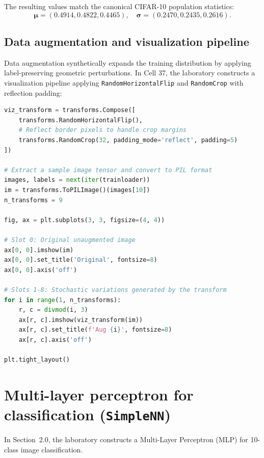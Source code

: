 \documentclass[../labs.tex]{subfiles}
\begin{document}
The resulting values match the canonical CIFAR-10 population statistics:
\begin{equation}
\boldsymbol{\mu} = (0.4914, 0.4822, 0.4465), \quad \boldsymbol{\sigma} = (0.2470, 0.2435, 0.2616).
\end{equation}

\subsection{Data augmentation and visualization pipeline}
Data augmentation synthetically expands the training distribution by applying label-preserving geometric perturbations. In Cell 37, the laboratory constructs a visualization pipeline applying \texttt{RandomHorizontalFlip} and \texttt{RandomCrop} with reflection padding:

\begin{lstlisting}[language=Python, caption={Verified solution for data augmentation visualization (Cell 37).}, label={lst:lab01_augmentation_viz}]
viz_transform = transforms.Compose([
    transforms.RandomHorizontalFlip(),
    # Reflect border pixels to handle crop margins
    transforms.RandomCrop(32, padding_mode='reflect', padding=5)
])

# Extract a sample image tensor and convert to PIL format
images, labels = next(iter(trainloader))
im = transforms.ToPILImage()(images[10])
n_transforms = 9

fig, ax = plt.subplots(3, 3, figsize=(4, 4))

# Slot 0: Original unaugmented image
ax[0, 0].imshow(im)
ax[0, 0].set_title('Original', fontsize=8)
ax[0, 0].axis('off')

# Slots 1-8: Stochastic variations generated by the transform
for i in range(1, n_transforms):
    r, c = divmod(i, 3)
    ax[r, c].imshow(viz_transform(im))
    ax[r, c].set_title(f'Aug {i}', fontsize=8)
    ax[r, c].axis('off')

plt.tight_layout()
\end{lstlisting}


\section{Multi-layer perceptron for classification (\texttt{SimpleNN})}

In Section~2.0, the laboratory constructs a Multi-Layer Perceptron (MLP) for 10-class image classification.
\end{document}
